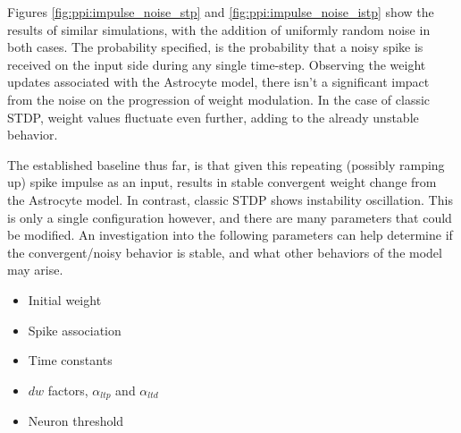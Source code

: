 

Figures \ref{fig:ppi:impulse_noise_stp} and \ref{fig:ppi:impulse_noise_istp}
show the results of similar simulations, with the addition of uniformly random
noise in both cases. The probability specified, is the probability that a noisy
spike is received on the input side during any single time-step. Observing the
weight updates associated with the Astrocyte model, there isn't a significant
impact from the noise on the progression of weight modulation. In the case of
classic STDP, weight values fluctuate even further, adding to the already
unstable behavior.



The established baseline thus far, is that given this repeating (possibly
ramping up) spike impulse as an input, results in stable convergent weight
change from the Astrocyte model. In contrast, classic STDP shows instability
oscillation. This is only a single configuration however, and there are many
parameters that could be modified. An investigation into the following
parameters can help determine if the convergent/noisy behavior is stable,
and what other behaviors of the model may arise.

\begin{itemize}
\item Initial weight
\item Spike association
\item Time constants
\item $dw$ factors, $\alpha_{ltp}$ and $\alpha_{ltd}$
\item Neuron threshold
\end{itemize}

